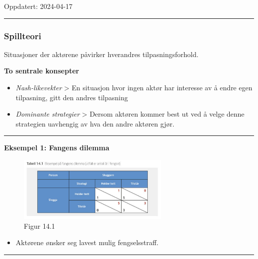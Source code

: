 \documentclass[
  letterpaper,
  DIV=11,
  numbers=noendperiod]{scrartcl}
\providecommand{\tightlist}{%
  \setlength{\itemsep}{0pt}\setlength{\parskip}{0pt}}\usepackage{longtable,booktabs,array}
\begin{document}
Oppdatert: 2024-04-17

\begin{center}\rule{0.5\linewidth}{0.5pt}\end{center}

\subsubsection{Spillteori}\label{spillteori}

Situasjoner der aktørene påvirker hverandres tilpasningsforhold.

\textbf{To sentrale konsepter}

\begin{itemize}
\tightlist
\item
  \emph{Nash-likevekter} \textgreater{} En situasjon hvor ingen aktør
  har interesse av å endre egen tilpasning, gitt den andres tilpasning
\item
  \emph{Dominante strategier} \textgreater{} Dersom aktøren kommer best
  ut ved å velge denne strategien uavhengig av hva den andre aktøren
  gjør.
\end{itemize}

\begin{center}\rule{0.5\linewidth}{0.5pt}\end{center}

\textbf{Eksempel 1: Fangens dilemma}

\begin{figure}[H]

{\centering \includegraphics[width=0.65\textwidth,height=\textheight]{drawio/tabell_14.1.png}

}

\caption{Figur 14.1}

\end{figure}%

\begin{itemize}
\tightlist
\item
  Aktørene ønsker seg lavest mulig fengselsstraff.
\end{itemize}

\begin{center}\rule{0.5\linewidth}{0.5pt}\end{center}
\end{document}
